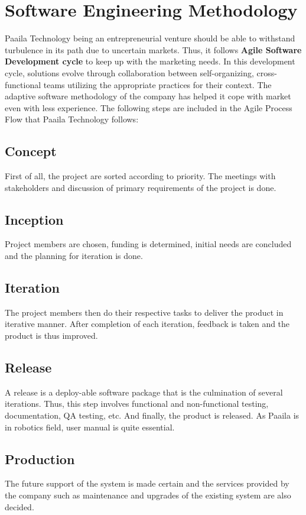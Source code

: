 \documentclass[12pt,a4paper]{scrreprt}
\begin{document}
\chapter{Software Engineering Methodology}
Paaila Technology being an entrepreneurial venture should be able to withstand turbulence in its path due to uncertain markets. Thus, it follows \textbf{ Agile Software Development cycle} to keep up with the marketing needs. In this development cycle, solutions evolve through
collaboration between self-organizing, cross-functional teams utilizing the appropriate
practices for their context. The adaptive software methodology of the company has helped it cope with market even with less experience. 
The following steps are included in the Agile Process Flow that Paaila Technology follows:
\section{Concept}
First of all, the project are sorted according to priority. The meetings with stakeholders and discussion of primary requirements of the project is done.
\section{Inception}
Project members are chosen, funding is determined, initial needs are concluded and the planning for iteration is done.
\section{Iteration}
The project members then do their respective tasks to deliver the product in iterative manner. After completion of each iteration, feedback is taken and the product is thus improved.
\section{Release}
A release is a deploy-able software package that is the culmination of several iterations. Thus, this step involves functional and non-functional testing, documentation, QA testing, etc. And finally, the product is released. As Paaila is in robotics field, user manual is quite essential.
\section{Production}
The future support of the system is made certain and the services provided by the company such as maintenance and upgrades of the existing system are also decided.
\end{document}
